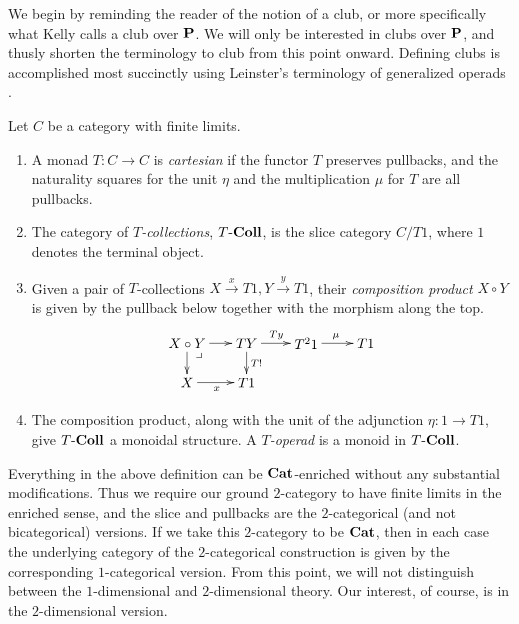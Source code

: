 We begin by reminding the reader of the notion of a club, or more specifically what Kelly \cite{kelly_club1,kelly_club2} calls a club over $\mathbf{P}$. We will only be interested in clubs over $\mathbf{P}$, and thusly shorten the terminology to club from this point onward. Defining clubs is accomplished most succinctly using Leinster's terminology of generalized operads \cite{leinster}.

\begin{Defi}
Let $C$ be a category with finite limits.
\begin{enumerate}
\item A monad $T \colon C \rightarrow C$ is \textit{cartesian} if the functor $T$ preserves pullbacks, and the naturality squares for the unit $\eta$ and the multiplication $\mu$ for $T$ are all pullbacks.
\item The category of \textit{$T$-collections}, $T\mbox{-}\mathbf{Coll}$, is the slice category $C/T1$, where $1$ denotes the terminal object.
\item Given a pair of $T$-collections $X \stackrel{x}{\rightarrow} T1, Y \stackrel{y}{\rightarrow} T1$, their \textit{composition product} $X \circ Y$ is given by the pullback below together with the morphism along the top.
  \[
    \xy
      (0,0)*+{X \circ Y} ="00";
      (15,0)*+{TY} ="10";
      (30,0)*+{T^{2}1} ="20";
      (45,0)*+{T1} ="30";
      (0,-10)*+{X} ="01";
      (15,-10)*+{T1} ="11";
      {\ar^{} "00" ; "10"};
      {\ar^{Ty} "10" ; "20"};
      {\ar^{\mu} "20" ; "30"};
      {\ar^{T!} "10" ; "11"};
      {\ar_{x} "01" ; "11"};
      {\ar^{} "00" ; "01"};
      (3,-3)*{\lrcorner};
    \endxy
  \]
\item The composition product, along with the unit of the adjunction $\eta \colon 1 \rightarrow T1$, give $T\mbox{-}\mathbf{Coll}$ a monoidal structure. A \textit{$T$-operad} is a monoid in $T\mbox{-}\mathbf{Coll}$.
\end{enumerate}
\end{Defi}

\begin{rem}
Everything in the above definition can be $\mathbf{Cat}$-enriched without any substantial modifications. Thus we require our ground $2$-category to have finite limits in the enriched sense, and the slice and pullbacks are the $2$-categorical (and not bicategorical) versions. If we take this $2$-category to be $\mathbf{Cat}$, then in each case the underlying category of the $2$-categorical construction is given by the corresponding $1$-categorical version. From this point, we will not distinguish between the $1$-dimensional and $2$-dimensional theory. Our interest, of course, is in the $2$-dimensional version.
\end{rem}

